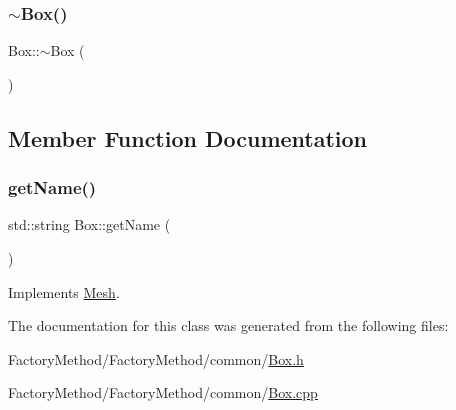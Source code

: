\subsubsection{\texorpdfstring{$\sim$Box()}{~Box()}}
{\footnotesize\ttfamily Box\+::$\sim$\+Box (\begin{DoxyParamCaption}{ }\end{DoxyParamCaption})}



\subsection{Member Function Documentation}
\mbox{\label{class_box_ac8792393d053c6cac65a36e5c1f27f15}} 
\subsubsection{\texorpdfstring{getName()}{getName()}}
{\footnotesize\ttfamily std\+::string Box\+::get\+Name (\begin{DoxyParamCaption}{ }\end{DoxyParamCaption})\hspace{0.3cm}{\ttfamily [virtual]}}



Implements \mbox{\hyperlink{class_mesh_aa131fe1c2586fe60988155db77c57272}{Mesh}}.



The documentation for this class was generated from the following files\+:\begin{DoxyCompactItemize}
\item 
Factory\+Method/\+Factory\+Method/common/\mbox{\hyperlink{_box_8h}{Box.\+h}}\item 
Factory\+Method/\+Factory\+Method/common/\mbox{\hyperlink{_box_8cpp}{Box.\+cpp}}\end{DoxyCompactItemize}
